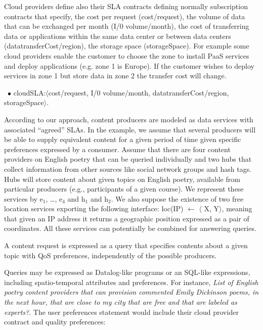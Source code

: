 Cloud providers define also their SLA contracts defining normally subscription contracts that specify, the cost per request ({\sf cost/request}), the volume of data that can be exchanged per month ({\sf I/0 volume/month}), the cost of transferring data or applications within the same data center or between data centers ({\sf datatransferCost/region}), the storage space ({\sf storageSpace}). For example some cloud providers enable the customer to choose the zone to install PaaS services and deploy applications (e.g. zone 1 is Europe). If the customer wishes to deploy services in zone 1 but store data in zone 2 the transfer cost will change.

\begin{trivlist}\sf\footnotesize
% 
 \item[~$\bullet$ ]  {\sf cloudSLA:$\langle$cost/request, I/0 volume/month, datatransferCost/region, storageSpace$\rangle$}. 
 \end{trivlist}
 

According to our approach, content producers are modeled as data services with associated ``agreed'' SLAs. In the example, we assume that several producers will be able to supply equivalent content for a given period of time given specific  preferences expressed by a consumer. 
Assume that there are four content providers on English poetry that can be queried individually and two hubs that collect information from other sources like social network groups and hash tags.
Hubs will store content about given topics on  English poetry, available from particular producers (e.g., participants of a given course).
We represent these services by {\sf e$_1$, \dots, e$_4$} and {\sf h$_1$} and {\sf h$_2$}.
We also suppose the existence of two free location services exporting the following interface: {\sf loc(IP) $\leftarrow$ $\langle$ X, Y$\rangle$}, meaning that given an IP address it returns a geographic position expressed as a pair of coordinates. 
All these services can potentially be combined for answering queries.

A content request is expressed as a query that specifies contents about a given topic with QoS preferences, independently of the possible producers. 

Queries may be expressed as Datalog-like programs or an SQL-like expressions, including spatio-temporal attributes and preferences.
For instance, \textit{List of English poetry content providers that can provision commented Emily Dickinson poems, in the next hour, that are close to my city that are free and that are labeled as experts?}. 
The user preferences statement would include their cloud provider contract and quality preferences:

